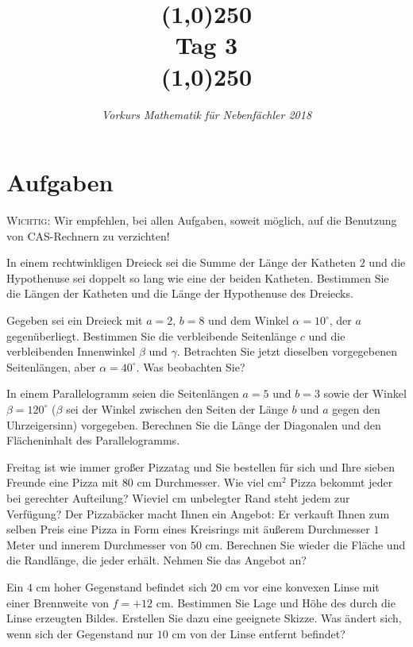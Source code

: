 \documentclass[11pt]{article}
\begin{document}
\title{\line(1,0){250}\\Tag 3\\\line(1,0){250}}
\date{}
\author{\itshape Vorkurs Mathematik für Nebenfächler 2018}
\maketitle
\section*{Aufgaben}
\textsc{Wichtig:} Wir empfehlen, bei allen Aufgaben, soweit möglich, auf die Benutzung von CAS-Rechnern zu verzichten!
\begin{task}
	In einem rechtwinkligen Dreieck sei die Summe der L\"ange der Katheten
	$2$ und die Hypothenuse sei doppelt so lang wie eine der beiden Katheten.
	Bestimmen Sie die L\"angen der Katheten und die L\"ange der Hypothenuse des
	Dreiecks.
\end{task}
\begin{task}
	Gegeben sei ein Dreieck mit $a=2$, $b=8$ und dem Winkel $\alpha=10^\circ$,
	der $a$ gegen\"uberliegt. Bestimmen Sie die verbleibende Seitenl\"ange $c$ und
	die verbleibenden Innenwinkel $\beta$ und $\gamma$. Betrachten Sie jetzt
	dieselben vorgegebenen Seitenl\"angen, aber $\alpha=40^\circ$. Was beobachten
	Sie?
\end{task}
\begin{task}
	 In einem Parallelogramm seien die Seitenl\"angen $a=5$ und $b=3$ sowie
	 der Winkel $\beta=120^\circ$ ($\beta$ sei der Winkel zwischen den
	 Seiten der L\"ange $b$ und $a$ gegen den Uhrzeigersinn) vorgegeben. Berechnen
	 Sie die L\"ange der Diagonalen und den Fl\"acheninhalt des Parallelogramms.
\end{task}
\begin{task}
	Freitag ist wie immer gro\ss er Pizzatag und Sie bestellen f\"ur sich
	und Ihre sieben Freunde eine Pizza mit $80$ cm Durchmesser. Wie viel cm$^2$
	Pizza bekommt jeder bei gerechter Aufteilung? Wieviel cm unbelegter Rand steht
	jedem zur Verf\"ugung? Der Pizzab\"acker macht Ihnen ein Angebot: Er verkauft
	Ihnen zum selben Preis eine Pizza in Form eines Kreisrings mit \"au\ss erem
	Durchmesser $1$ Meter und innerem Durchmesser von $50$ cm. Berechnen Sie wieder
	die Fl\"ache und die Randl\"ange, die jeder erh\"alt. Nehmen Sie das Angebot an?
\end{task}
\begin{task}
Ein $4$ cm hoher Gegenstand befindet sich $20$ cm vor eine konvexen Linse mit einer Brennweite von $f=+12$ cm. Bestimmen Sie Lage und H\"ohe des durch die Linse erzeugten Bildes. 
Erstellen Sie dazu eine geeignete Skizze. Was \"andert sich, wenn sich der Gegenstand nur $10$ cm von der Linse entfernt befindet?
\end{task}
\end{document}
